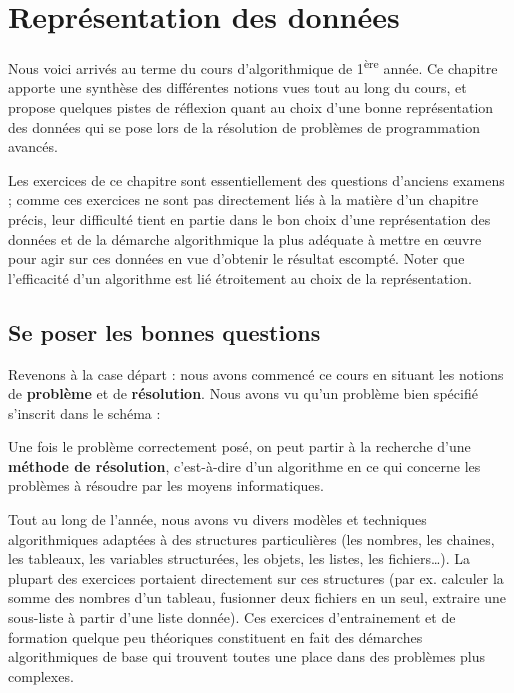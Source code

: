 \chapter{Représentation des données%
}

Nous voici arrivés au terme du cours d'algorithmique de
1\textsuperscript{ère} année. Ce chapitre apporte une synthèse des
différentes notions vues tout au long du cours, et propose quelques
pistes de réflexion quant au choix d’une bonne représentation des
données qui se pose lors de la résolution de problèmes de programmation
avancés.

Les exercices de ce chapitre sont essentiellement des questions
d’anciens examens ; comme ces exercices ne sont pas directement liés à
la matière d’un chapitre précis, leur difficulté tient en partie dans
le bon choix d’une représentation des données et de la démarche
algorithmique la plus adéquate à mettre en œuvre pour agir sur ces
données en vue d’obtenir le résultat escompté. Noter que l’efficacité
d’un algorithme est lié étroitement au choix de la représentation.

\section{Se poser les bonnes questions}

Revenons à la case départ : nous avons commencé ce cours en situant les
notions de \textbf{problème} et de \textbf{résolution}. Nous avons vu
qu’un problème bien spécifié s’inscrit dans le schéma :


Une fois le problème correctement posé, on peut partir à la recherche
d’une \textbf{méthode de résolution}, c’est-à-dire d’un algorithme en
ce qui concerne les problèmes à résoudre par les moyens informatiques.

Tout au long de l’année, nous avons vu divers modèles et techniques
algorithmiques adaptées à des structures particulières (les nombres,
les chaines, les tableaux, les variables structurées, les objets, les
listes, les fichiers…). La plupart des exercices portaient directement
sur ces structures (par ex. calculer la somme des nombres d’un tableau,
fusionner deux fichiers en un seul, extraire une sous-liste à partir
d’une liste donnée). Ces exercices d’entrainement et de formation
quelque peu théoriques constituent en fait des démarches algorithmiques
de base qui trouvent toutes une place dans des problèmes plus
complexes.

